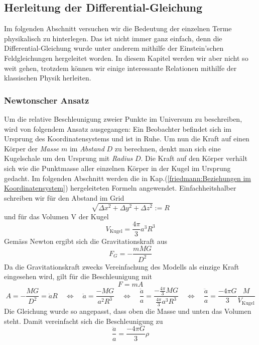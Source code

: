 \begin{refsection}
\subsection{Herleitung der Differential-Gleichung}
Im folgenden Abschnitt versuchen wir die Bedeutung der einzelnen Terme physikalisch zu hinterlegen. Das ist nicht immer ganz einfach, denn die Differential-Gleichung wurde unter anderem mithilfe der Einstein'schen Feldgleichungen hergeleitet worden. In diesem Kapitel werden wir aber nicht so weit gehen, trotzdem können wir einige interessante Relationen mithilfe der klassischen Physik herleiten.
\subsubsection{Newtonscher Ansatz}
Um die relative Beschleunigung zweier Punkte im Universum zu beschreiben, wird von folgendem Ansatz ausgegangen: Ein Beobachter befindet sich im Ursprung des Koordinatensystems und ist in Ruhe. Um nun die Kraft auf einen Körper der {\em Masse} $m$ im {\em Abstand} $D$ zu berechnen, denkt man sich eine Kugelschale um den Ursprung mit {\em Radius} $D$. Die Kraft auf den Körper verhält sich wie die Punktmasse aller  einzelnen Körper in der Kugel im Ursprung gedacht.
Im folgenden Abschnitt werden die in Kap.(\ref{friedmann:Beziehungen im Koordinatensystem}) hergeleiteten Formeln angewendet. Einfachheitshalber schreiben wir für den Abstand im Grid
\[ \sqrt{\Delta x^2 + \Delta y^2 + \Delta z^2} := R \]
und für das Volumen V der Kugel
\[V_\text{Kugel} = \frac{4 \pi }{3} a^3 R^3\]
Gemäss Newton ergibt sich die Gravitationskraft aus
\begin{equation}
F_G = -\frac{m M G}{D^2}
\end{equation}
Da die Gravitationskraft zwecks Vereinfachung des Modells als einzige Kraft eingesehen wird, gilt für die Beschleunigung mit 
\[F = m A\]
\[A = - \frac{M G}{D^2} = \ddot{a} R \quad\Leftrightarrow\quad \ddot{a} = \frac{- M G}{a^2 R^3} \quad\Leftrightarrow\quad \frac{\ddot{a}}{a} = \frac{-\frac{4 \pi }{3} M G}{\frac{4 \pi}{3}a^3 R^3} \quad\Leftrightarrow\quad \frac{\ddot{a}}{a} = \frac{- 4 \pi G}{3} \frac{M}{V_\text{Kugel}}\]
Die Gleichung wurde so angepasst, dass oben die Masse und unten das Volumen steht. Damit vereinfacht sich die Beschleunigung zu
\begin{equation}
\frac{\ddot{a}}{a} = \frac{- 4 \pi G}{3} \rho
\end{equation}

\end{refsection}
